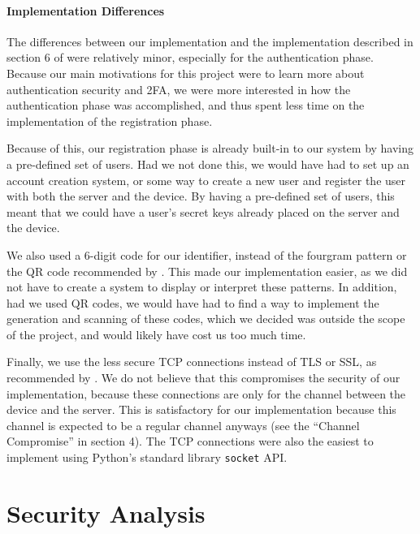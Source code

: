 \documentclass[11pt]{article}
\begin{document}
\paragraph{Implementation Differences}

The differences between our implementation and the implementation
described in section 6 of \cite{shirvanian2d2fa} were relatively minor,
especially for the authentication phase. Because our main motivations
for this project were to learn more about authentication security and
2FA, we were more interested in how the authentication phase was
accomplished, and thus spent less time on the implementation of the
registration phase. 

Because of this, our registration phase is already built-in to our
system by having a pre-defined set of users. Had we not done this, we
would have had to set up an account creation system, or some way to
create a new user and register the user with both the server and the
device. By having a pre-defined set of users, this meant that we could
have a user's secret keys already placed on the server and the device. 

We also used a 6-digit code for our identifier, instead of the fourgram
pattern or the QR code recommended by \cite{shirvanian2d2fa}. This made
our implementation easier, as we did not have to create a system to
display or interpret these patterns. In addition, had we used QR codes,
we would have had to find a way to implement the generation and scanning
of these codes, which we decided was outside the scope of the
project, and would likely have cost us too much time. 

Finally, we use the less secure TCP connections instead of TLS or SSL,
as recommended by \cite{shirvanian2d2fa}. We do not believe that this
compromises the security of our implementation, because these
connections are only for the channel between the device and the server.
This is satisfactory for our implementation because this channel is
expected to be a regular channel anyways (see the ``Channel Compromise''
in section 4). The TCP connections were also the easiest to implement
using Python's standard library \texttt{socket} API. 

\section{Security Analysis}
\end{document}
